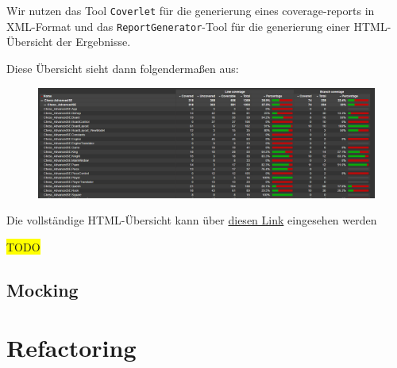 \documentclass[
10pt, %
a4paper, %
oneside, %
headinclude,footinclude, %
BCOR5mm, %
]{scrartcl}
\begin{document}
\begin{onehalfspace}
Wir nutzen das Tool \texttt{Coverlet} für die generierung eines coverage-reports in XML-Format und das \texttt{ReportGenerator}-Tool für die generierung einer HTML-Übersicht der Ergebnisse.

Diese Übersicht sieht dann folgendermaßen aus:
\begin{figure}[ht!]
	\includegraphics[width=\linewidth]{coveragereport}
\end{figure}

Die vollständige HTML-Übersicht kann über \href{}{diesen Link} eingesehen werden

\colorbox{yellow}{TODO}
\subsection{Mocking}
\newpage
\section{Refactoring}

\end{onehalfspace}
\end{document}
